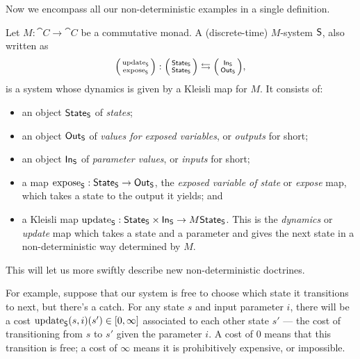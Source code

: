 \documentclass[DynamicalBook]{subfiles}
\begin{document}
Now we encompass all our non-deterministic examples in a single definition.
\begin{definition}\label{def.monadic_system}
Let $M : \cat{C} \to \cat{C}$ be a commutative monad. A (discrete-time)
$M$-system $\mathsf{S}$, also written as   
  $$\lens{\update{S}}{\expose{S}} : \lens{\State{S}}{\State{S}} \leftrightarrows \lens{\In{S}}{\Out{S}},$$ 
is a system whose dynamics is given by a Kleisli map for $M$. It consists of:
  \begin{itemize}
    \item an object $\mathsf{State}_{\mathsf{S}}$ of \emph{states};
    \item an object $\mathsf{Out}_{\mathsf{S}}$ of \emph{values for exposed variables}, or \emph{outputs}
      for short;
    \item an object $\mathsf{In}_{\mathsf{S}}$ of \emph{parameter values}, or \emph{inputs} for short;
    \item a map $\mathrm{expose}_{\mathsf{S}} : \mathsf{State}_{\mathsf{S}} \to \mathsf{Out}_{\mathsf{S}}$, the \emph{exposed variable of state} or
      \emph{expose} map, which takes a state to the output it yields; and
    \item a Kleisli map $\mathrm{update}_{\mathsf{S}} : \mathsf{State}_{\mathsf{S}} \times \mathsf{In}_{\mathsf{S}} \to
     M\mathsf{State}_{\mathsf{S}}$. This is the \emph{dynamics} or
      \emph{update} map which takes a state and a parameter and gives the
      next state in a non-deterministic way determined by $M$.
  \end{itemize}
\end{definition}

This will let us more swiftly describe new non-deterministic doctrines.

For
example, suppose that our system is free to choose which state it transitions
to next, but there's a catch. For any state $s$ and input parameter $i$, there
will be a cost $\mathrm{update}_{\mathsf{S}}(s, i)(s') \in [0, \infty]$ associated to each other state $s'$ ---
the cost of transitioning from $s$ to $s'$ given the parameter $i$. A cost of
$0$ means that this transition is free; a cost of $\infty$ means it is
prohibitively expensive, or impossible.
\end{document}

